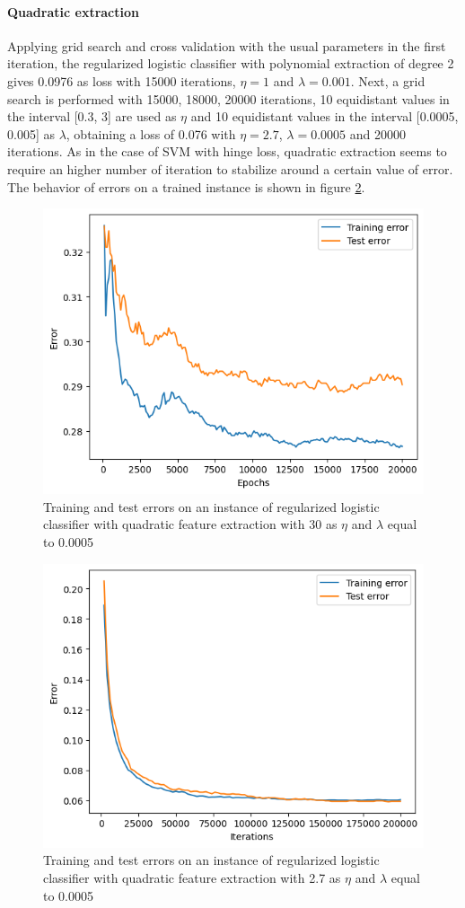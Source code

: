 \documentclass{article}
\begin{document}
\paragraph{Quadratic extraction}
Applying grid search and cross validation with the usual parameters in the first iteration, the regularized logistic classifier with polynomial extraction of degree 2 gives 0.0976 as loss with 15000 iterations, $\eta=1$ and $\lambda=0.001$. Next, a grid search is performed with 15000, 18000, 20000 iterations, 10 equidistant values in the interval [0.3, 3] are used as $\eta$ and 10 equidistant values in the interval [0.0005, 0.005] as $\lambda$, obtaining a loss of 0.076 with $\eta=2.7$, $\lambda=0.0005$ and 20000 iterations. As in the case of SVM with hinge loss, quadratic extraction seems to require an higher number of iteration to stabilize around a certain value of error. The behavior of errors on a trained instance is shown in figure \ref{fig:quad_svm_log}.
\begin{figure}
	\centering
	\includegraphics[width=0.5\columnwidth]{../plots/svm_log.png}
	\caption{Training and test errors on an instance of regularized logistic classifier with quadratic feature extraction with 30 as $\eta$ and $\lambda$ equal to 0.0005}
	\label{fig:svm_log}
\end{figure}
\begin{figure}
	\centering
	\includegraphics[width=0.5\columnwidth]{../plots/quad_svm_log.png}
	\caption{Training and test errors on an instance of regularized logistic classifier with quadratic feature extraction with 2.7 as $\eta$ and $\lambda$ equal to 0.0005}
	\label{fig:quad_svm_log}
\end{figure}
\end{document}
